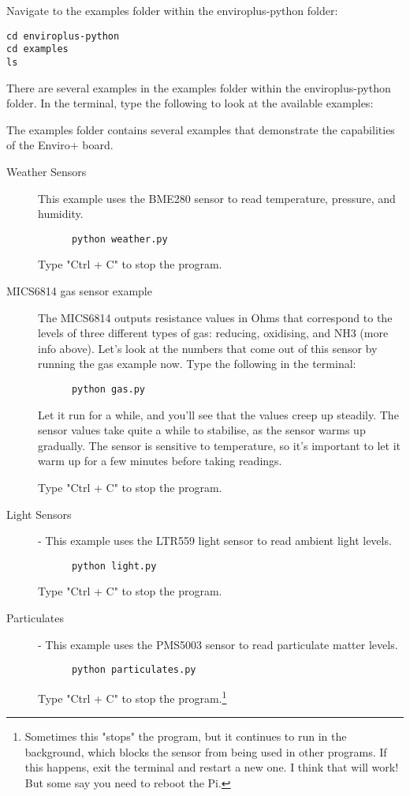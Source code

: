 \documentclass{article}
\begin{document}
Navigate to the examples folder within the enviroplus-python folder:

\begin{verbatim}
cd enviroplus-python
cd examples
ls
\end{verbatim}

There are several examples in the examples folder within the enviroplus-python folder. In the terminal, type the following to look at the available examples:

The examples folder contains several examples that demonstrate the capabilities of the Enviro+ board.

\begin{description}
  \item[Weather Sensors] This example uses the BME280 sensor to read temperature, pressure, and humidity.
  
  \begin{verbatim}
      python weather.py
  \end{verbatim} 
  
  Type "Ctrl + C" to stop the program.
  
  \item[MICS6814 gas sensor example] The MICS6814 outputs resistance values in Ohms that correspond to the levels of three different types of gas: reducing, oxidising, and NH3 (more info above). Let's look at the numbers that come out of this sensor by running the gas example now. Type the following in the terminal:
  
  \begin{verbatim}
      python gas.py
  \end{verbatim}
  
Let it run for a while, and you'll see that the values creep up steadily. The sensor values take quite a while to stabilise, as the sensor warms up gradually. The sensor is sensitive to temperature, so it's important to let it warm up for a few minutes before taking readings.

Type "Ctrl + C" to stop the program.

\item[Light Sensors] - This example uses the LTR559 light sensor to read ambient light levels.

\begin{verbatim}
      python light.py
\end{verbatim}

Type "Ctrl + C" to stop the program.

\item[Particulates] - This example uses the PMS5003 sensor to read particulate matter levels.

\begin{verbatim}
      python particulates.py
\end{verbatim}

Type "Ctrl + C" to stop the program.\footnote{Sometimes this "stops" the program, but it continues to run in the background, which blocks the sensor from being used in other programs. If this happens, exit the terminal and restart a new one. I think that will work! But some say you need to reboot the Pi.}
  
\end{description}
\end{document}
